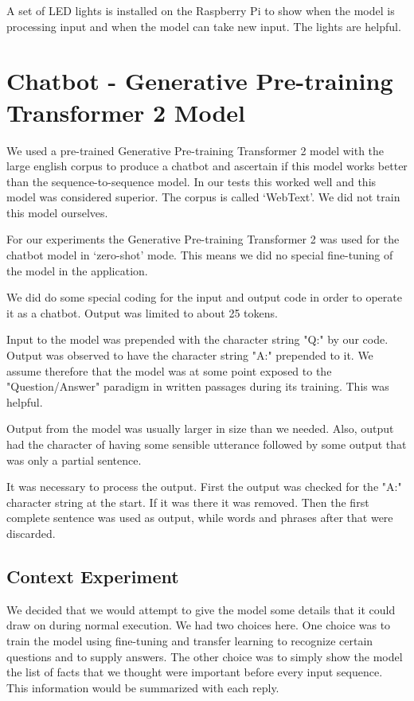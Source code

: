 A set of LED lights is installed on the Raspberry Pi to show when the model is processing input and when the model can take new input. The lights are helpful.


\section{Chatbot - Generative Pre-training Transformer 2 Model}
We used a pre-trained Generative Pre-training Transformer 2 model with the large english corpus to produce a chatbot and ascertain if this model works better than the sequence-to-sequence model. In our tests this worked well and this model was considered superior. The corpus is called `WebText'. We did not train this model ourselves.

For our experiments the Generative Pre-training Transformer 2 was used for the chatbot model in `zero-shot' mode. This means we did no special fine-tuning of the model in the application.

We did do some special coding for the input and output code in order to operate it as a chatbot. Output was limited to about 25 tokens. 

Input to the model was prepended with the character string "Q:" by our code. Output was observed to have the character string "A:" prepended to it. We assume therefore that the model was at some point exposed to the "Question/Answer" paradigm in written passages during its training. This was helpful.

Output from the model was usually larger in size than we needed. Also, output had the character of having some sensible utterance followed by some output that was only a partial sentence.

It was necessary to process the output. First the output was checked for the "A:" character string at the start. If it was there it was removed. Then the first complete sentence was used as output, while words and phrases after that were discarded.

\subsection{Context Experiment}
We decided that we would attempt to give the model some details that it could draw on during normal execution. We had two choices here. One choice was to train the model using fine-tuning and transfer learning to recognize certain questions and to supply answers. The other choice was to simply show the model the list of facts that we thought were important before every input sequence. This information would be summarized with each reply.

